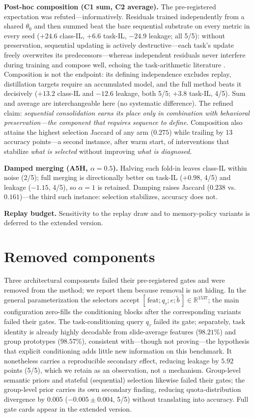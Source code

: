 \documentclass{article}
\begin{document}
\textbf{Post-hoc composition (C1 sum, C2 average).} The pre-registered expectation was refuted---informatively. Residuals trained independently from a shared $\theta_0$ and then summed beat the bare sequential substrate on every metric in every seed ($+24.6$ class-IL, $+6.6$ task-IL, $-24.9$ leakage; all 5/5): without preservation, sequential updating is actively destructive---each task's update freely overwrites its predecessors---whereas independent residuals never interfere during training and compose well, echoing the task-arithmetic literature \cite{ilharco2023task}. Composition is not the endpoint: its defining independence excludes replay, distillation targets require an accumulated model, and the full method beats it decisively ($+13.2$ class-IL and $-12.6$ leakage, both 5/5; $+3.8$ task-IL, 4/5). Sum and average are interchangeable here (no systematic difference). The refined claim: \emph{sequential consolidation earns its place only in combination with behavioral preservation---the component that requires sequence to define}. Composition also attains the highest selection Jaccard of any arm ($0.275$) while trailing by 13 accuracy points---a second instance, after warm start, of interventions that stabilize \emph{what is selected} without improving \emph{what is diagnosed}.

\textbf{Damped merging (A5H, $\alpha{=}0.5$).} Halving each fold-in leaves class-IL within noise (2/5); full merging is directionally better on task-IL ($+0.98$, 4/5) and leakage ($-1.15$, 4/5), so $\alpha{=}1$ is retained. Damping raises Jaccard ($0.238$ vs.\ $0.161$)---the third such instance: selection stabilizes, accuracy does not.

\textbf{Replay budget.} Sensitivity to the replay draw and to memory-policy variants is deferred to the extended version.

\section{Removed components}
\label{sec:removed}
Three architectural components failed their pre-registered gates and were removed from the method; we report them because removal is not hiding. In the general parameterization the selectors accept $[\,\mathrm{feat};q_\tau;e;\tilde b\,]\in\mathbb{R}^{1537}$; the main configuration zero-fills the conditioning blocks after the corresponding variants failed their gates. The task-conditioning query $q_\tau$ failed its gate; separately, task identity is already highly decodable from slide-average features ($98.21\%$) and group prototypes ($98.57\%$), consistent with---though not proving---the hypothesis that explicit conditioning adds little new information on this benchmark. It nonetheless carries a reproducible secondary effect, reducing leakage by $5.92$ points (5/5), which we retain as an observation, not a mechanism. Group-level semantic priors and stateful (sequential) selection likewise failed their gates; the group-level prior carries its own secondary finding, reducing quota-distribution divergence by $0.005$ ($-0.005{\pm}0.004$, 5/5) without translating into accuracy. Full gate cards appear in the extended version.
\end{document}
